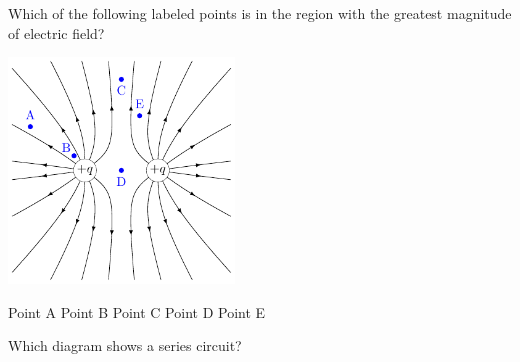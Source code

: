 \documentclass[answers]{exam}
\begin{document}
\begin{questions}
\question
Which of the following labeled points is in the region with the greatest magnitude of electric field?

\begin{center}
    \includegraphics[width=6cm]{documents/figures/electric-field-lines-2.pdf}
\end{center}

\begin{randomizeoneparchoices}[norandomize]
    \choice Point A
    \correctchoice Point B
    \choice Point C
    \choice Point D
    \choice Point E
\end{randomizeoneparchoices}

\question
Which diagram shows a series circuit?


\end{questions}
\end{document}
